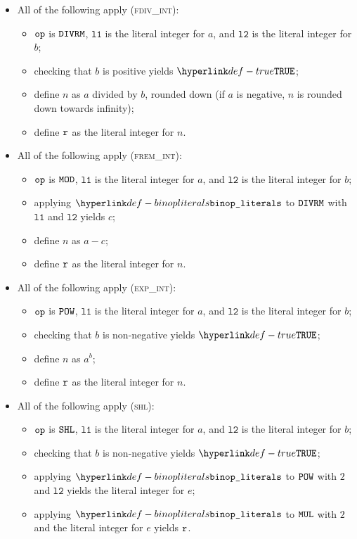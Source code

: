 \documentclass{book}
\newcommand\ProseOrTypeError[0]{\ProseTerminateAs{\TypeErrorConfig}}
\newcommand\vlone[0]{\texttt{l1}}
\newcommand\vltwo[0]{\texttt{l2}}
\begin{document}
\begin{itemize}
  \item All of the following apply (\textsc{fdiv\_int}):
  \begin{itemize}
    \item $\texttt{op}$ is $\texttt{DIVRM}$, $\vlone$ is the literal integer for $a$, and $\vltwo$ is the literal integer for $b$;
    \item checking that $b$ is positive yields $\True$\ProseOrTypeError;
    \item define $n$ as $a$ divided by $b$, rounded down (if $a$ is negative, $n$ is rounded down towards infinity);
    \item define $\texttt{r}$ as the literal integer for $n$.
  \end{itemize}

  \item All of the following apply (\textsc{frem\_int}):
  \begin{itemize}
    \item $\texttt{op}$ is $\texttt{MOD}$, $\vlone$ is the literal integer for $a$, and $\vltwo$ is the literal integer for $b$;
    \item applying $\binopliterals$ to $\texttt{DIVRM}$ with $\vlone$ and $\vltwo$ yields $c$\ProseOrTypeError;
    \item define $n$ as $a-c$;
    \item define $\texttt{r}$ as the literal integer for $n$.
  \end{itemize}

  \item All of the following apply (\textsc{exp\_int}):
  \begin{itemize}
    \item $\texttt{op}$ is $\texttt{POW}$, $\vlone$ is the literal integer for $a$, and $\vltwo$ is the literal integer for $b$;
    \item checking that $b$ is non-negative yields $\True$\ProseOrTypeError;
    \item define $n$ as $a^b$;
    \item define $\texttt{r}$ as the literal integer for $n$.
  \end{itemize}

  \item All of the following apply (\textsc{shl}):
  \begin{itemize}
    \item $\texttt{op}$ is $\texttt{SHL}$, $\vlone$ is the literal integer for $a$, and $\vltwo$ is the literal integer for $b$;
    \item checking that $b$ is non-negative yields $\True$\ProseOrTypeError;
    \item applying $\binopliterals$ to $\texttt{POW}$ with $2$ and $\vltwo$ yields the literal integer for $e$;
    \item applying $\binopliterals$ to $\texttt{MUL}$ with $2$ and the literal integer for $e$ yields $\texttt{r}$.
  \end{itemize}


\end{itemize}
\end{document}
